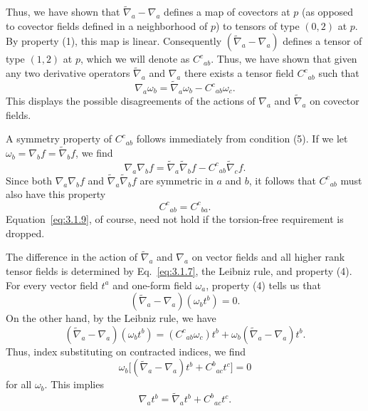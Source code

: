Thus, we have shown that $\widetilde\nabla_a-\nabla_a$ defines a map of covectors at $p$ (as opposed
to covector fields defined in a neighborhood of $p$) to tensors of type $(0,2)$ at $p$.
By property (1), this map is linear. Consequently $(\widetilde\nabla_a-\nabla_a)$ defines a tensor of type
$(1,2)$ at $p$, which we will denote as $C^c{}_{ab}$. Thus, we have shown that given any two
derivative operators $\widetilde\nabla_a$ and $\nabla_a$ there exists a tensor field $C^c{}_{ab}$ such that
\begin{equation}
  \nabla_a\omega_b=\widetilde\nabla_a\omega_b-C^c{}_{ab}\omega_c.
  \tag{3.1.7}\label{eq:3.1.7}
\end{equation}
This displays the possible disagreements of the actions of $\nabla_a$ and $\widetilde\nabla_a$ on covector
fields.

A symmetry property of $C^c{}_{ab}$ follows immediately from condition (5). If we let
$\omega_b=\nabla_bf=\widetilde\nabla_bf$, we find
\begin{equation}
  \nabla_a\nabla_bf=\widetilde\nabla_a\widetilde\nabla_bf-C^c{}_{ab}\widetilde\nabla_cf.
  \tag{3.1.8}\label{eq:3.1.8}
\end{equation}
Since both $\nabla_a\nabla_bf$ and $\widetilde\nabla_a\widetilde\nabla_bf$ are symmetric in $a$ and $b$, it follows that $C^c{}_{ab}$ must also
have this property
\begin{equation}
  C^c{}_{ab}=C^c{}_{ba}.
  \tag{3.1.9}\label{eq:3.1.9}
\end{equation}
Equation~\eqref{eq:3.1.9}, of course, need not hold if the torsion-free requirement is dropped.

The difference in the action of $\widetilde\nabla_a$ and $\nabla_a$ on vector fields and all higher rank tensor
fields is determined by Eq.~\eqref{eq:3.1.7}, the Leibniz rule, and property (4). For
every vector field $t^a$ and one-form field $\omega_a$, property (4) tells us that
\begin{equation}
  (\widetilde\nabla_a-\nabla_a)(\omega_bt^b)=0.
  \tag{3.1.10}\label{eq:3.1.10}
\end{equation}
On the other hand, by the Leibniz rule, we have
\begin{equation}
  (\widetilde\nabla_a-\nabla_a)(\omega_bt^b)
  =(C^c{}_{ab}\omega_c)t^b+\omega_b(\widetilde\nabla_a-\nabla_a)t^b.
  \tag{3.1.11}\label{eq:3.1.11}
\end{equation}
Thus, index substituting on contracted indices, we find
\begin{equation}
  \omega_b\bigl[(\widetilde\nabla_a-\nabla_a)t^b+C^b{}_{ac}t^c\bigr]=0
  \tag{3.1.12}\label{eq:3.1.12}
\end{equation}
for all $\omega_b$. This implies
\begin{equation}
  \nabla_at^b=\widetilde\nabla_at^b+C^b{}_{ac}t^c.
  \tag{3.1.13}\label{eq:3.1.13}
\end{equation}

